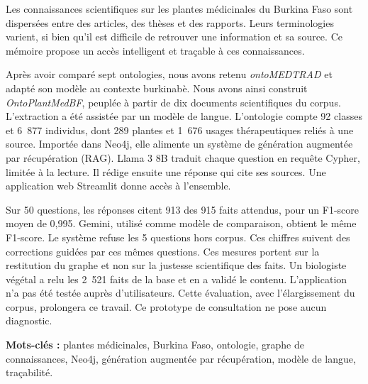Les connaissances scientifiques sur les plantes médicinales du Burkina Faso sont dispersées entre des articles, des thèses et des rapports. Leurs terminologies varient, si bien qu'il est difficile de retrouver une information et sa source. Ce mémoire propose un accès intelligent et traçable à ces connaissances.

Après avoir comparé sept ontologies, nous avons retenu \textit{ontoMEDTRAD} et adapté son modèle au contexte burkinabè. Nous avons ainsi construit \textit{OntoPlantMedBF}, peuplée à partir de dix documents scientifiques du corpus. L'extraction a été assistée par un modèle de langue. L'ontologie compte 92 classes et 6~877 individus, dont 289 plantes et 1~676 usages thérapeutiques reliés à une source. Importée dans Neo4j, elle alimente un système de génération augmentée par récupération (RAG). Llama 3 8B traduit chaque question en requête Cypher, limitée à la lecture. Il rédige ensuite une réponse qui cite ses sources. Une application web Streamlit donne accès à l'ensemble.

Sur 50 questions, les réponses citent 913 des 915 faits attendus, pour un F1-score moyen de 0,995. Gemini, utilisé comme modèle de comparaison, obtient le même F1-score. Le système refuse les 5 questions hors corpus. Ces chiffres suivent des corrections guidées par ces mêmes questions. Ces mesures portent sur la restitution du graphe et non sur la justesse scientifique des faits. Un biologiste végétal a relu les 2~521 faits de la base et en a validé le contenu. L'application n'a pas été testée auprès d'utilisateurs. Cette évaluation, avec l'élargissement du corpus, prolongera ce travail. Ce prototype de consultation ne pose aucun diagnostic.

\vspace{1em}
\noindent\textbf{Mots-clés :} plantes médicinales, Burkina Faso, ontologie, graphe de connaissances, Neo4j, génération augmentée par récupération, modèle de langue, traçabilité.
